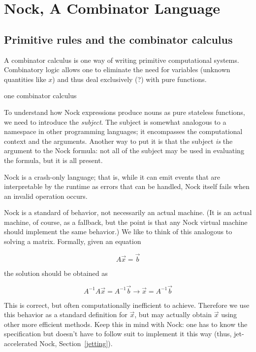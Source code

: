 \setchapterpreamble[u]{\margintoc}
\chapter{Nock, A Combinator Language}


\section{Primitive rules and the combinator calculus}


A combinator calculus is one way of writing primitive computational systems.  Combinatory logic allows one to eliminate the need for variables (unknown quantities like $x$) and thus deal exclusively (?) with pure functions.

one combinator calculus



To understand how Nock expressions produce nouns as pure stateless functions, we need to introduce the \emph{subject}.  The subject is somewhat analogous to a namespace in other programming languages; it encompasses the computational context and the arguments.  Another way to put it is that the subject \emph{is} the argument to the Nock formula:  not all of the subject may be used in evaluating the formula, but it is all present.


Nock is a crash-only language; that is, while it can emit events that are interpretable by the runtime as errors that can be handled, Nock itself fails when an invalid operation occurs.

Nock is a standard of behavior, not necessarily an actual machine.  (It is an actual machine, of course, as a fallback, but the point is that any Nock virtual machine should implement the same behavior.)  We like to think of this analogous to solving a matrix.  Formally, given an equation

$$
A \vec{x} = \vec{b}
$$

the solution should be obtained as

$$
A^{-1} A \vec{x} = A^{-1} \vec{b} \rightarrow \vec{x} = A^{-1} \vec{b}
$$

This is correct, but often computationally inefficient to achieve.  Therefore we use this behavior as a standard definition for $\vec{x}$, but may actually obtain $\vec{x}$ using other more efficient methods.  Keep this in mind with Nock:  one has to know the specification but doesn't have to follow suit to implement it this way (thus, jet-accelerated Nock, Section~\ref{jetting}).

